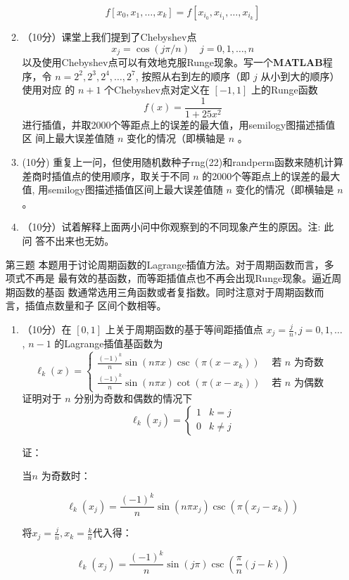 \documentclass[12pt,a4paper,UTF8]{ctexart}
\theoremstyle{nonumberplain}
\begin{document}
\begin{enumerate}
\begin{enumerate}
$$
f\left[x_{0}, x_{1}, \ldots, x_{k}\right]=f\left[x_{i_{0}}, x_{i_{1}}, \ldots, x_{i_{k}}\right]
$$
\item （10分）课堂上我们提到了Chebyshev点
$$
x_{j}=\cos (j \pi / n) \quad j=0,1, \ldots, n
$$
以及使用Chebyshev点可以有效地克服Runge现象。写一个\textbf{MATLAB}程序，令 $n=2^{2}, 2^{3}, 2^{4}, \ldots, 2^{7}$, 按照从右到左的顺序（即 $j$ 从小到大的顺序）使用对应
的 $n+1$ 个Chebyshev点对定义在 $[-1,1]$ 上的Runge函数
$$
f(x)=\frac{1}{1+25 x^{2}}
$$
进行插值，并取2000个等距点上的误差的最大值，用semilogy图描述插值区
间上最大误差值随 $n$ 变化的情况（即横轴是 $n$ 。
\item (10分) 重复上一问，但使用随机数种子rng(22)和randperm函数来随机计算 差商时插值点的使用顺序，取关于不同 $n$ 的2000个等距点上的误差的最大值,
用semilogy图描述插值区间上最大误差值随 $n$ 变化的情况（即横轴是 $n$ 。
\item（10分）试着解释上面两小问中你观察到的不同现象产生的原因。注: 此问
答不出来也无妨。
\end{enumerate}
\item[第三题] 本题用于讨论周期函数的Lagrange插值方法。对于周期函数而言，多项式不再是 最有效的基函数，而等距插值点也不再会出现Runge现象。逼近周期函数的基函 数通常选用三角函数或者复指数。同时注意对于周期函数而言，插值点数量和子
区间个数相等。
\begin{enumerate}\item （10分）在 $[0,1]$ 上关于周期函数的基于等间距插值点 $x_{j}=\frac{j}{n}, j=0,1, \ldots$, $n-1$ 的Lagrange插值基函数为
$$
\ell_{k}(x)=\left\{\begin{array}{ll}
\frac{(-1)^{k}}{n} \sin (n \pi x) \csc \left(\pi\left(x-x_{k}\right)\right) & \text { 若 } n \text { 为奇数 } \\
\frac{(-1)^{k}}{n} \sin (n \pi x) \cot \left(\pi\left(x-x_{k}\right)\right) & \text { 若 } n \text { 为偶数 }
\end{array}\right.
$$
证明对于 $n$ 分别为奇数和偶数的情况下
$$
\ell_{k}\left(x_{j}\right)=\left\{\begin{array}{ll}
1 & k=j \\
0 & k \neq j
\end{array}\right.
$$
\par 证：
\par 当$n$ 为奇数时：
\par $$\ell_{k}\left(x_{j}\right)=\frac{(-1)^{k}}{n} \sin (n \pi x_{j}) \csc \left(\pi\left(x_{j}-x_{k}\right)\right)$$
\par 将$x_{j}=\frac{j}{n},x_{k}=\frac{k}{n}$代入得：
\par $$\ell_{k}\left(x_{j}\right)=\frac{(-1)^{k}}{n} \sin (j \pi ) \csc \left(\frac{\pi}{n}\left(j-k\right)\right)$$

\end{enumerate}
\end{enumerate}
\end{document}
